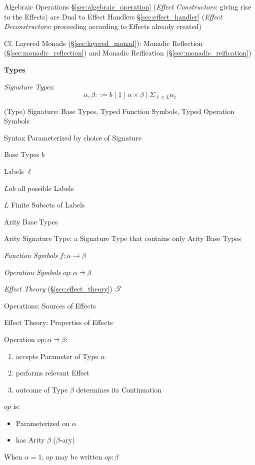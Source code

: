 Algebraic Operations \S\ref{sec:algebraic_operation} (\emph{Effect
  Constructors}: giving rise to the Effects) are Dual to Effect
Handlers \S\ref{sec:effect_handler} (\emph{Effect Deconstructors}:
proceeding according to Effects already created)

\fist Cf. Layered Monads (\S\ref{sec:layered_monad}): Monadic
Reflection (\S\ref{sec:monadic_reflection}) and Monadic Reification
(\S\ref{sec:monadic_reification})


\textbf{Types}

\emph{Signature Types}:
\[
  \alpha, \beta ::= b \;|\; 1 \;|\; \alpha \times \beta \;|\;
    \Sigma_{\ell \in L} \alpha_\ell
\]

(Type) Signature: Base Types, Typed Function Symbols, Typed Operation
Symbols

Syntax Parameterized by choice of Signature

Base Types $b$

Labels $\ell$

$Lab$ all possible Labels

$L$ Finite Subsets of Labels

Arity Base Types

Arity Signature Type: a Signature Type that contains only Arity Base
Types

\emph{Function Symbols} $f : \alpha \rightarrow \beta$

\emph{Operation Symbols} $op : \alpha \rightarrowtriangle \beta$

\emph{Effect Theory} (\S\ref{sec:effect_theory}) $\mathscr{T}$

Operations: Sources of Effects

Effect Theory: Properties of Effects

Operation $op : \alpha \rightarrowtriangle \beta$:
\begin{enumerate}
  \item accepts Parameter of Type $\alpha$
  \item performs relevant Effect
  \item outcome of Type $\beta$ determines its Continuation
\end{enumerate}

$op$ is:
\begin{itemize}
  \item Parameterized on $\alpha$
  \item has Arity $\beta$ ($\beta$-ary)
\end{itemize}

When $\alpha = 1$, $op$ may be written $op:\beta$

